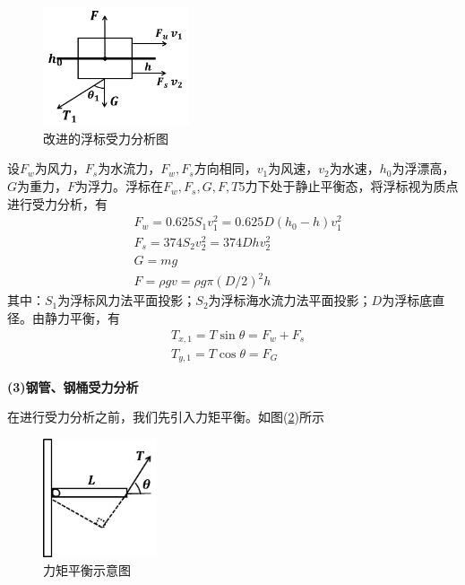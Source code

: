             \begin{figure}[H]
            \centering
            \includegraphics[height=3.5cm]{images/Improved_buoy_force_analysis_chart.jpg}
            \caption{改进的浮标受力分析图}
            \label{改进的浮标受力分析图}
            \end{figure}
            设$F_w$为风力，$F_s$为水流力，$F_w,F_s$方向相同，$v_1$为风速，$v_2$为水速，$h_0$为浮漂高，$G$为重力，$F$为浮力。浮标在$F_w,F_s,G,F,T$5力下处于静止平衡态，将浮标视为质点进行受力分析，有
            \begin{align*}
            & F_w = 0.625S_1 v_1^2 = 0.625 D(h_0-h)v_1^2\\
            & F_s = 374S_2 v_2^2 = 374 D hv_2^2\\
            & G = mg\\
            & F=\rho g v = \rho g\pi (D/2)^2h
            \end{align*}
            其中：$S_1$为浮标风力法平面投影；$S_2$为浮标海水流力法平面投影；$D$为浮标底直径。由静力平衡，有
            \begin{align*}
            & T_{x,1} = T\sin \theta = F_w+F_s\\
            & T_{y,1} = T\cos\theta = F_G
            \end{align*}
            \par
            \textbf{(3)钢管、钢桶受力分析}
            \par
            在进行受力分析之前，我们先引入力矩平衡。如图(\ref{力矩平衡示意图})所示
            \begin{figure}[H]
            \centering
            \includegraphics[height=3.5cm]{images/Moment_balance_diagram.jpg}
            \caption{力矩平衡示意图}
            \label{力矩平衡示意图}
            \end{figure}
